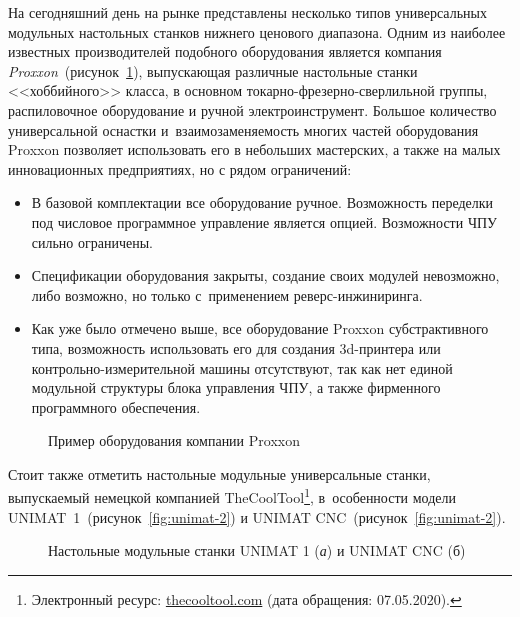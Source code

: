 На сегодняшний день на рынке представлены несколько типов универсальных модульных настольных станков нижнего ценового диапазона. Одним из наиболее известных производителей подобного оборудования является компания \textit{Proxxon}~(рисунок~\cref{fig:proxxon}), выпускающая различные настольные станки <<хоббийного>> класса, в основном токарно-фрезерно-сверлильной группы, распиловочное оборудование и ручной электроинструмент. Большое количество универсальной оснастки и~взаимозаменяемость многих частей оборудования Proxxon позволяет использовать его в небольших мастерских, а также на малых инновационных предприятиях, но с рядом ограничений:

\begin{itemize}
	\item В базовой комплектации все оборудование ручное. Возможность переделки под числовое программное управление является опцией. Возможности ЧПУ сильно ограничены.
	\item Спецификации оборудования закрыты, создание своих модулей невозможно, либо возможно, но только с~применением реверс-инжиниринга.
	\item Как уже было отмечено выше, все оборудование Proxxon субстрактивного типа, возможность использовать его для создания 3d-принтера или контрольно-измерительной машины отсутствуют, так как нет единой модульной структуры блока управления ЧПУ, а также фирменного программного обеспечения.	
\end{itemize}

\begin{figure}[ht]
	\caption{Пример оборудования компании Proxxon}\label{fig:proxxon}
\end{figure}

Стоит также отметить настольные модульные универсальные станки, выпускаемый немецкой компанией TheCoolTool\footnote{Электронный ресурс: {\small\url{thecooltool.com}} (дата обращения: 07.05.2020).}, в~особенности модели UNIMAT~1~(рисунок~\cref{fig:unimat-2}) и UNIMAT CNC~(рисунок~\cref{fig:unimat-2}).

\begin{figure}[ht]
	\caption[Настольные модульные станки UNIMAT 1 и UNIMAT CNC]{Настольные модульные станки UNIMAT 1 (\textit{а}) и UNIMAT CNC (б)}\label{fig:unimat}
\end{figure}

